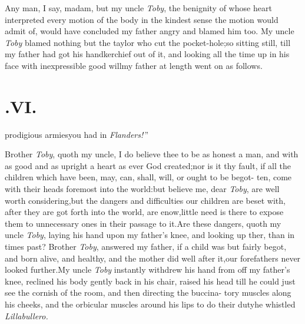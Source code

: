 \documentclass{article}
\begin{document}
Any man, I say, madam, but my uncle \textit{Toby}, the benignity of whose heart
interpreted every motion of the body in the kindest sense the motion would admit of,
would have concluded my father angry and blamed him too. My uncle \textit{Toby}
blamed nothing but the taylor who cut the pocket-hole;\tsh so sitting still, till
my father had got his handkerchief out of it, and looking all the time up in his face
with inexpressible good will\tsh my father at length went on as follows.

\null
\section{.\quad  VI.}

prodigious armies\break you had in \textit{Flanders!}\,”

\tsh Brother \textit{Toby}, quoth my uncle\sic,\break
I do believe thee to be as honest a man,\break
and with as good and as upright a heart\break
as ever God created;\tsh nor is it thy\break
fault, if all the children which have been,\break
may, can, shall, will, or ought to be begot-\break
ten, come with their heads foremost into\break
the world:\tsh but believe me, dear \textit{Toby},\break
{}
are well worth considering,\tsh but the dangers and difficulties
our children are beset with, after they are got forth into the
world, are enow,\tsk little need is there to expose them to
unnecessary ones in their passage to it.\tsk Are these dangers,
quoth my uncle \textit{Toby}, laying his hand upon my father’s
knee, and looking up   ther, than in times past? Brother \textit{Toby}, answered
my father, if a child was but fairly begot, and born alive, and
healthy, and the mother did well after it,\tsk our forefathers
never looked further.\tsh My uncle \textit{Toby} instantly
withdrew his hand from off my father’s knee, reclined his body
gently back in his chair, raised his head till he could just see
the cornish of the room, and then directing the
buccina-\break
tory muscles along his cheeks, and the 
orbicular muscles around his lips to do their duty\tsk he
whistled \textit{Lillabullero.}
\end{document}
